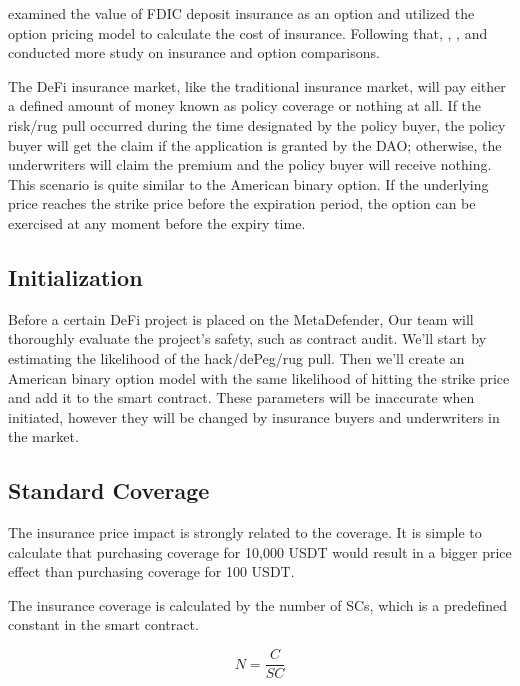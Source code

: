\cite{Marcus et al., 1984} examined the value of FDIC deposit insurance as an option and utilized the option pricing model to calculate the cost of insurance.
Following that, \cite{RONN et al., 1986}, \cite{Laeven et al., 2002}, and \cite{Falkenheim et al., 2003} conducted more study on insurance and option comparisons.

The DeFi insurance market, like the traditional insurance market, will pay either a defined amount of money known as policy coverage or nothing at all.
If the risk/rug pull occurred during the time designated by the policy buyer, the policy buyer will get the claim if the application is granted by the DAO; otherwise, the underwriters will claim the premium and the policy buyer will receive nothing.
This scenario is quite similar to the American binary option.
If the underlying price reaches the strike price before the expiration period, the option can be exercised at any moment before the expiry time.

\subsection{Initialization}\label{subsec:initialization}

Before a certain DeFi project is placed on the MetaDefender, Our team will thoroughly evaluate the project's safety, such as contract audit.
We'll start by estimating the likelihood of the hack/dePeg/rug pull.
Then we'll create an American binary option model with the same likelihood of hitting the strike price and add it to the smart contract.
These parameters will be inaccurate when initiated, however they will be changed by insurance buyers and underwriters in the market.

\subsection{Standard Coverage}\label{subsec:standard-coverage}

The insurance price impact is strongly related to the coverage.
It is simple to calculate that purchasing coverage for 10,000 USDT would result in a bigger price effect than purchasing coverage for 100 USDT.

The insurance coverage is calculated by the number of SCs, which is a predefined constant in the smart contract.

\begin{equation}
	N = \frac{C}{SC}\label{eq:equation}
\end{equation}

